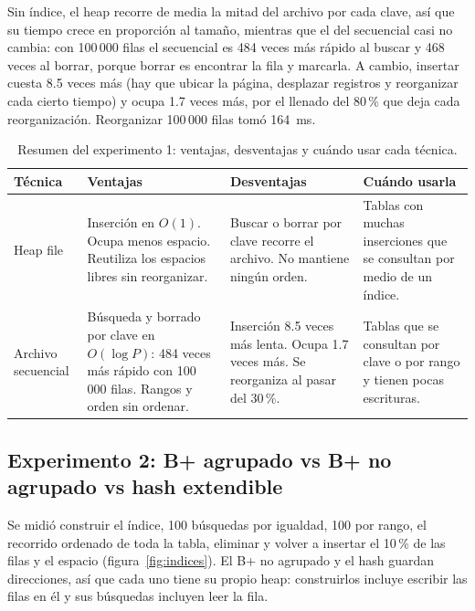 Sin índice, el heap recorre de media la mitad del archivo por cada clave, así que su tiempo
crece en proporción al tamaño, mientras que el del secuencial casi no cambia: con 100\,000
filas el secuencial es 484 veces más rápido al buscar y 468 veces al borrar, porque borrar
es encontrar la fila y marcarla. A cambio, insertar cuesta 8.5 veces más (hay que ubicar la
página, desplazar registros y reorganizar cada cierto tiempo) y ocupa 1.7 veces más, por el
llenado del 80\,\% que deja cada reorganización. Reorganizar 100\,000 filas tomó 164~ms.

\begin{table}[!htb]
\centering
\caption{Resumen del experimento 1: ventajas, desventajas y cuándo usar cada técnica.}\label{tab:resumen-almacenamiento}
\small
\begin{tabular}{@{}L{2.4cm}L{4.6cm}L{4.6cm}L{4.2cm}@{}}
\toprule
\textbf{Técnica} & \textbf{Ventajas} & \textbf{Desventajas} & \textbf{Cuándo usarla} \\
\midrule
Heap file & Inserción en $O(1)$. Ocupa menos espacio. Reutiliza los espacios libres sin reorganizar. & Buscar o borrar por clave recorre el archivo. No mantiene ningún orden. & Tablas con muchas inserciones que se consultan por medio de un índice. \\
Archivo secuencial & Búsqueda y borrado por clave en $O(\log P)$: 484 veces más rápido con 100\,000 filas. Rangos y orden sin ordenar. & Inserción 8.5 veces más lenta. Ocupa 1.7 veces más. Se reorganiza al pasar del 30\,\%. & Tablas que se consultan por clave o por rango y tienen pocas escrituras. \\
\bottomrule
\end{tabular}
\end{table}

\FloatBarrier
\subsection{Experimento 2: B+ agrupado vs B+ no agrupado vs hash extendible}

Se midió construir el índice, 100 búsquedas por igualdad, 100 por rango, el recorrido
ordenado de toda la tabla, eliminar y volver a insertar el 10\,\% de las filas y el espacio
(figura~\ref{fig:indices}). El B+ no agrupado y el hash guardan direcciones, así que cada uno
tiene su propio heap: construirlos incluye escribir las filas en él y sus búsquedas
incluyen leer la fila.


